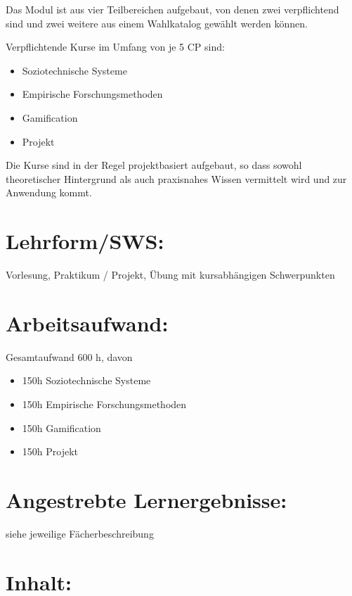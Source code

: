Das Modul ist aus vier Teilbereichen aufgebaut, von denen zwei
verpflichtend sind und zwei weitere aus einem Wahlkatalog gewählt werden
können.

Verpflichtende Kurse im Umfang von je 5 CP sind:

\begin{itemize}
\item
  Soziotechnische Systeme
\item
  Empirische Forschungsmethoden
\item
  Gamification
\item
  Projekt
\end{itemize}

Die Kurse sind in der Regel projektbasiert aufgebaut, so dass sowohl
theoretischer Hintergrund als auch praxisnahes Wissen vermittelt wird
und zur Anwendung kommt.

\section*{Lehrform/SWS:}\label{lehrformsws-27}

Vorlesung, Praktikum / Projekt, Übung mit kursabhängigen Schwerpunkten

\section*{Arbeitsaufwand:}\label{arbeitsaufwand-26}

Gesamtaufwand 600 h, davon

\begin{itemize}
\item
  150h Soziotechnische Systeme
\item
  150h Empirische Forschungsmethoden
\item
  150h Gamification
\item
  150h Projekt
\end{itemize}

\section*{Angestrebte
Lernergebnisse:}\label{angestrebte-lernergebnisse-27}

siehe jeweilige Fächerbeschreibung

\section*{Inhalt:}\label{inhalt-27}

